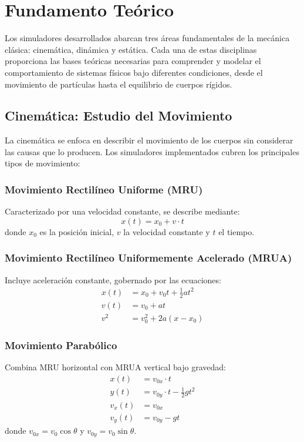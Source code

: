 \section{Fundamento Teórico}

Los simuladores desarrollados abarcan tres áreas fundamentales de la mecánica clásica: cinemática, dinámica y estática. Cada una de estas disciplinas proporciona las bases teóricas necesarias para comprender y modelar el comportamiento de sistemas físicos bajo diferentes condiciones, desde el movimiento de partículas hasta el equilibrio de cuerpos rígidos.

\subsection{Cinemática: Estudio del Movimiento}

La cinemática se enfoca en describir el movimiento de los cuerpos sin considerar las causas que lo producen. Los simuladores implementados cubren los principales tipos de movimiento:

\subsubsection{Movimiento Rectilíneo Uniforme (MRU)}
Caracterizado por una velocidad constante, se describe mediante:
\begin{equation}
x(t) = x_0 + v \cdot t
\end{equation}
donde $x_0$ es la posición inicial, $v$ la velocidad constante y $t$ el tiempo.

\subsubsection{Movimiento Rectilíneo Uniformemente Acelerado (MRUA)}
Incluye aceleración constante, gobernado por las ecuaciones:
\begin{align}
x(t) &= x_0 + v_0 t + \frac{1}{2} a t^2 \\
v(t) &= v_0 + a t \\
v^2 &= v_0^2 + 2a(x - x_0)
\end{align}

\subsubsection{Movimiento Parabólico}
Combina MRU horizontal con MRUA vertical bajo gravedad:
\begin{align}
x(t) &= v_{0x} \cdot t \\
y(t) &= v_{0y} \cdot t - \frac{1}{2} g t^2 \\
v_x(t) &= v_{0x} \\
v_y(t) &= v_{0y} - g t
\end{align}
donde $v_{0x} = v_0 \cos\theta$ y $v_{0y} = v_0 \sin\theta$.

